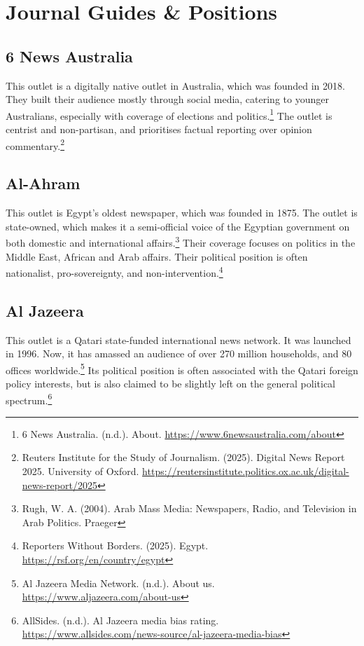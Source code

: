 \section{Journal Guides \& Positions}

\subsection{6 News Australia}

This outlet is a digitally native outlet in Australia, which was founded in 2018. They built their audience mostly through social media, catering to younger Australians, especially with coverage of elections and politics.\footnote{6 News Australia. (n.d.). About. \url{https://www.6newsaustralia.com/about}} The outlet is centrist and non-partisan, and prioritises factual reporting over opinion commentary.\footnote{Reuters Institute for the Study of Journalism. (2025). Digital News Report 2025. University of Oxford. \url{https://reutersinstitute.politics.ox.ac.uk/digital-news-report/2025}}

\subsection{Al-Ahram}

This outlet is Egypt’s oldest newspaper, which was founded in 1875. The outlet is state-owned, which makes it a semi-official voice of the Egyptian government on both domestic and international affairs.\footnote{Rugh, W. A. (2004). Arab Mass Media: Newspapers, Radio, and Television in Arab Politics. Praeger} Their coverage focuses on politics in the Middle East, African and Arab affairs. Their political position is often nationalist, pro-sovereignty, and non-intervention.\footnote{Reporters Without Borders. (2025). Egypt. \url{https://rsf.org/en/country/egypt}}

\subsection{Al Jazeera}

This outlet is a Qatari state-funded international news network. It was launched in 1996. Now, it has amassed an audience of over 270 million households, and 80 offices worldwide.\footnote{Al Jazeera Media Network. (n.d.). About us. \url{https://www.aljazeera.com/about-us}} Its political position is often associated with the Qatari foreign policy interests, but is also claimed to be slightly left on the general political spectrum.\footnote{AllSides. (n.d.). Al Jazeera media bias rating. \url{https://www.allsides.com/news-source/al-jazeera-media-bias}}

